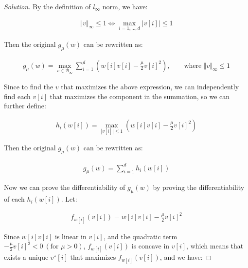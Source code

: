 \documentclass{article}
\newenvironment{solution}
  {\renewcommand\qedsymbol{$\blacksquare$}\begin{proof}[Solution]}
  {\end{proof}}
\begin{document}
\begin{solution}

    By the definition of $l_\infty$ norm, we have:

    \begin{align*}
        \Vert v \Vert_\infty \leq 1 \iff \max_{i = 1, \dots, d} \vert v[i] \vert \leq 1
    \end{align*}

    Then the original $g_\mu(w)$ can be rewritten as:

    \begin{align*}
        g_\mu(w) = \max_{v \in \mathcal{B}_\infty} \sum_{i=1}^d \left( w[i] v[i] - \frac{\mu}{2} v[i]^2\right), \qquad \text{where } \Vert v \Vert_\infty \leq 1
    \end{align*}

    Since to find the $v$ that maximizes the above expression, 
    we can independently find each $v[i]$ that maximizes the component in the summation, 
    so we can further define:

    \begin{align*}
        h_i(w[i]) = \max_{|v[i]| \leq 1} \left( w[i] v[i] - \frac{\mu}{2} v[i]^2 \right)
    \end{align*}

    Then the original $g_\mu(w)$ can be rewritten as:

    \begin{align*}
        g_\mu(w) = \sum_{i=1}^d h_i(w[i])
    \end{align*}

    Now we can prove the differentiability of $g_\mu(w)$ by proving the differentiability of each $h_i(w[i])$.
    Let:

    \begin{align*}
        f_{w[i]}(v[i]) = w[i] v[i] - \frac{\mu}{2} v[i]^2
    \end{align*}

    Since $w[i] v[i]$ is linear in $v[i]$, 
    and the quadratic term $-\frac{\mu}{2} v[i]^2 < 0 \ (\text{for } \mu > 0)$, 
    $f_{w[i]}(v[i])$ is concave in $v[i]$, 
    which means that exists a unique $v^\star[i]$ that maximizes $f_{w[i]}(v[i])$, 
    and we have:


\end{solution}
\end{document}
